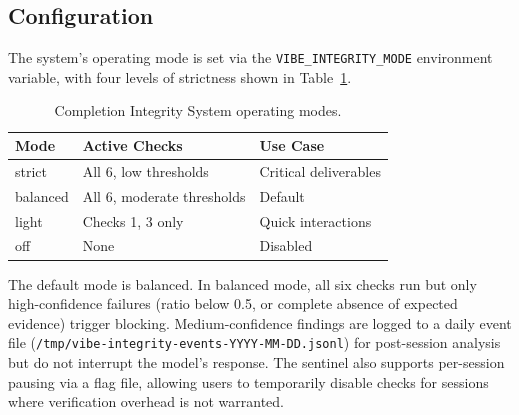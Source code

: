 \subsection{Configuration}
\label{sec:configuration}

The system's operating mode is set via the \texttt{VIBE\_INTEGRITY\_MODE} environment variable, with four levels of strictness shown in Table~\ref{tab:modes}.

\begin{table}[h]
\centering
\caption{Completion Integrity System operating modes.}
\label{tab:modes}
\begin{tabular}{lll}
\toprule
Mode & Active Checks & Use Case \\
\midrule
strict & All 6, low thresholds & Critical deliverables \\
balanced & All 6, moderate thresholds & Default \\
light & Checks 1, 3 only & Quick interactions \\
off & None & Disabled \\
\bottomrule
\end{tabular}
\end{table}

The default mode is balanced.
In balanced mode, all six checks run but only high-confidence failures (ratio below 0.5, or complete absence of expected evidence) trigger blocking.
Medium-confidence findings are logged to a daily event file (\texttt{/tmp/vibe-integrity-events-YYYY-MM-DD.jsonl}) for post-session analysis but do not interrupt the model's response.
The sentinel also supports per-session pausing via a flag file, allowing users to temporarily disable checks for sessions where verification overhead is not warranted.


